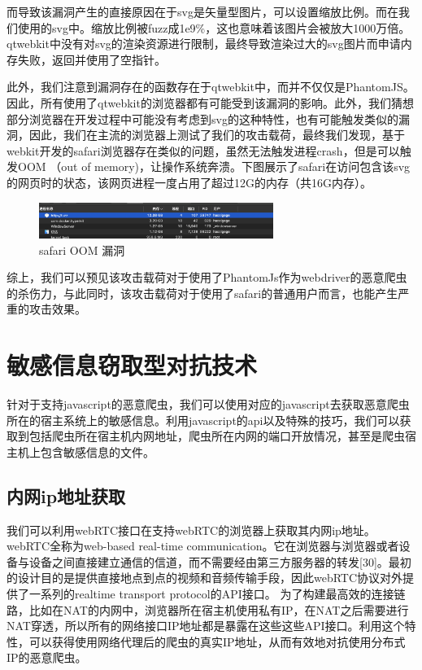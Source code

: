 \documentclass[doctor,privacy,twoside]{buaa_mac}
\begin{document}
而导致该漏洞产生的直接原因在于svg是矢量型图片，可以设置缩放比例。而在我们使用的svg中。缩放比例被fuzz成1e9\%，这也意味着该图片会被放大1000万倍。qtwebkit中没有对svg的渲染资源进行限制，最终导致渲染过大的svg图片而申请内存失败，返回并使用了空指针。

此外，我们注意到漏洞存在的函数存在于qtwebkit中，而并不仅仅是PhantomJS。因此，所有使用了qtwebkit的浏览器都有可能受到该漏洞的影响。此外，我们猜想部分浏览器在开发过程中可能没有考虑到svg的这种特性，也有可能触发类似的漏洞，因此，我们在主流的浏览器上测试了我们的攻击载荷，最终我们发现，基于webkit开发的safari浏览器存在类似的问题，虽然无法触发进程crash，但是可以触发OOM （out of memory)，让操作系统奔溃。下图展示了safari在访问包含该svg的网页时的状态，该网页进程一度占用了超过12G的内存（共16G内存）。

\centerline{}
\begin{figure}[!h]
  \centering
  \includegraphics[width=0.68\textwidth]{images/safari_oom.jpg}
  \caption{safari OOM 漏洞}
  \label{fig:logo}
\end{figure}
\centerline{}

综上，我们可以预见该攻击载荷对于使用了PhantomJs作为webdriver的恶意爬虫的杀伤力，与此同时，该攻击载荷对于使用了safari的普通用户而言，也能产生严重的攻击效果。



\section{敏感信息窃取型对抗技术}

针对于支持javascript的恶意爬虫，我们可以使用对应的javascript去获取恶意爬虫所在的宿主系统上的敏感信息。利用javascript的api以及特殊的技巧，我们可以获取到包括爬虫所在宿主机内网地址，爬虫所在内网的端口开放情况，甚至是爬虫宿主机上包含敏感信息的文件。


\subsection{内网ip地址获取}
我们可以利用webRTC接口在支持webRTC的浏览器上获取其内网ip地址。webRTC全称为web-based real-time communication。它在浏览器与浏览器或者设备与设备之间直接建立通信的信道，而不需要经由第三方服务器的转发[30]。最初的设计目的是提供直接地点到点的视频和音频传输手段，因此webRTC协议对外提供了一系列的realtime transport protocol的API接口。
为了构建最高效的连接链路，比如在NAT的内网中，浏览器所在宿主机使用私有IP，在NAT之后需要进行NAT穿透，所以所有的网络接口IP地址都是暴露在这些这些API接口。利用这个特性，可以获得使用网络代理后的爬虫的真实IP地址，从而有效地对抗使用分布式IP的恶意爬虫。
\end{document}
